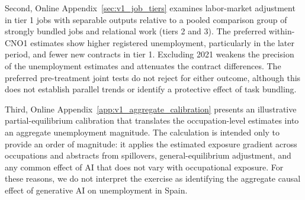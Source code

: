Second, Online Appendix~\ref{sec:v1_job_tiers} examines labor-market adjustment in tier 1 jobs with separable outputs relative to a pooled comparison group of strongly bundled jobs and relational work (tiers 2 and 3). The preferred within-CNO1 estimates show higher registered unemployment, particularly in the later period, and fewer new contracts in tier 1. Excluding 2021 weakens the precision of the unemployment estimates and attenuates the contract differences. The preferred pre-treatment joint tests do not reject for either outcome, although this does not establish parallel trends or identify a protective effect of task bundling.

Third, Online Appendix~\ref{app:v1_aggregate_calibration} presents an illustrative partial-equilibrium calibration that translates the occupation-level estimates into an aggregate unemployment magnitude. The calculation is intended only to provide an order of magnitude: it applies the estimated exposure gradient across occupations and abstracts from spillovers, general-equilibrium adjustment, and any common effect of AI that does not vary with occupational exposure. For these reasons, we do not interpret the exercise as identifying the aggregate causal effect of generative AI on unemployment in Spain.

